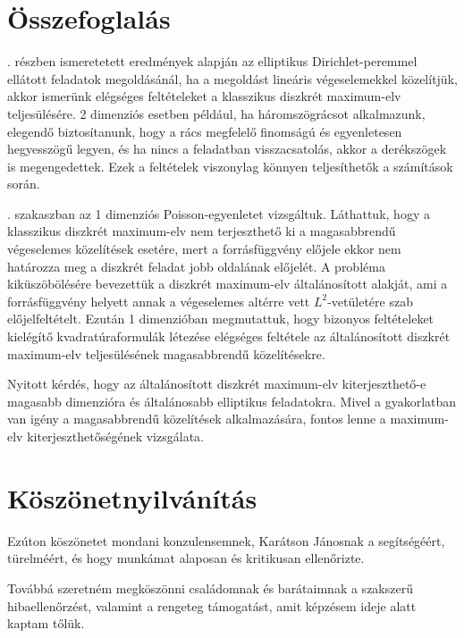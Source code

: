 \chapter*{Összefoglalás}

. részben ismeretetett eredmények alapján az elliptikus Dirichlet-peremmel ellátott feladatok megoldásánál, ha a megoldást lineáris végeselemekkel közelítjük, akkor ismerünk elégséges feltételeket a klasszikus diszkrét maximum-elv teljesülésére. 2 dimenziós esetben például, ha háromszögrácsot alkalmazunk, elegendő biztosítanunk, hogy a rács megfelelő finomságú és egyenletesen hegyesszögű legyen, és ha nincs a feladatban visszacsatolás, akkor a derékszögek is megengedettek. Ezek a feltételek viszonylag könnyen teljesíthetők a számítások során.

. szakaszban az 1 dimenziós Poisson-egyenletet vizsgáltuk. Láthattuk, hogy a klasszikus diszkrét maximum-elv nem terjeszthető ki a magasabbrendű végeselemes közelítések esetére, mert a forrásfüggvény előjele ekkor nem határozza meg a diszkrét feladat jobb oldalának előjelét. A probléma kiküszöbölésére bevezettük a diszkrét maximum-elv általánosított alakját, ami a forrásfüggvény helyett annak a végeselemes altérre vett $L^2$-vetületére szab előjelfeltételt. Ezután 1 dimenzióban megmutattuk, hogy bizonyos feltételeket kielégítő kvadratúraformulák létezése elégséges feltétele az általánosított diszkrét maximum-elv teljesülésének magasabbrendű közelítésekre.

Nyitott kérdés, hogy az általánosított diszkrét maximum-elv kiterjeszthető-e magasabb dimenzióra és általánosabb elliptikus feladatokra. Mivel a gyakorlatban van igény a magasabbrendű közelítések alkalmazására, fontos lenne a maximum-elv kiterjeszthetőségének vizsgálata. 

\chapter*{Köszönetnyilvánítás}

Ezúton köszönetet mondani konzulensemnek, Karátson Jánosnak a segítségéért, türelméért, és hogy munkámat alaposan és kritikusan ellenőrizte. 

Továbbá szeretném megköszönni családomnak és barátaimnak a szakszerű hibaellenőrzést, valamint a rengeteg támogatást, amit képzésem ideje alatt kaptam tőlük.



